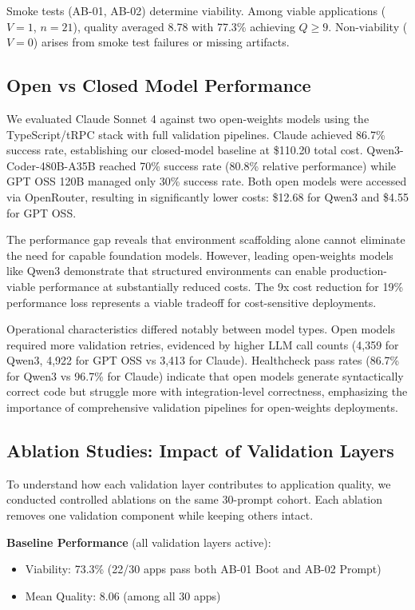 \documentclass{article}
\begin{document}
Smoke tests (AB-01, AB-02) determine viability. Among viable applications ($V=1$, $n=21$), quality averaged 8.78 with 77.3\% achieving $Q \geq 9$. Non-viability ($V=0$) arises from smoke test failures or missing artifacts.

\subsection{Open vs Closed Model Performance}

We evaluated Claude Sonnet 4 against two open-weights models using the TypeScript/tRPC stack with full validation pipelines. Claude achieved 86.7\% success rate, establishing our closed-model baseline at \$110.20 total cost. Qwen3-Coder-480B-A35B reached 70\% success rate (80.8\% relative performance) while GPT OSS 120B managed only 30\% success rate. Both open models were accessed via OpenRouter, resulting in significantly lower costs: \$12.68 for Qwen3 and \$4.55 for GPT OSS.

The performance gap reveals that environment scaffolding alone cannot eliminate the need for capable foundation models. However, leading open-weights models like Qwen3 demonstrate that structured environments can enable production-viable performance at substantially reduced costs. The 9x cost reduction for 19\% performance loss represents a viable tradeoff for cost-sensitive deployments.

Operational characteristics differed notably between model types. Open models required more validation retries, evidenced by higher LLM call counts (4,359 for Qwen3, 4,922 for GPT OSS vs 3,413 for Claude). Healthcheck pass rates (86.7\% for Qwen3 vs 96.7\% for Claude) indicate that open models generate syntactically correct code but struggle more with integration-level correctness, emphasizing the importance of comprehensive validation pipelines for open-weights deployments.

\subsection{Ablation Studies: Impact of Validation Layers}

To understand how each validation layer contributes to application quality, we conducted controlled ablations on the same 30-prompt cohort. Each ablation removes one validation component while keeping others intact.

\textbf{Baseline Performance} (all validation layers active):
\begin{itemize}
\item Viability: 73.3\% (22/30 apps pass both AB-01 Boot and AB-02 Prompt)
\item Mean Quality: 8.06 (among all 30 apps)
\end{itemize}
\end{document}

